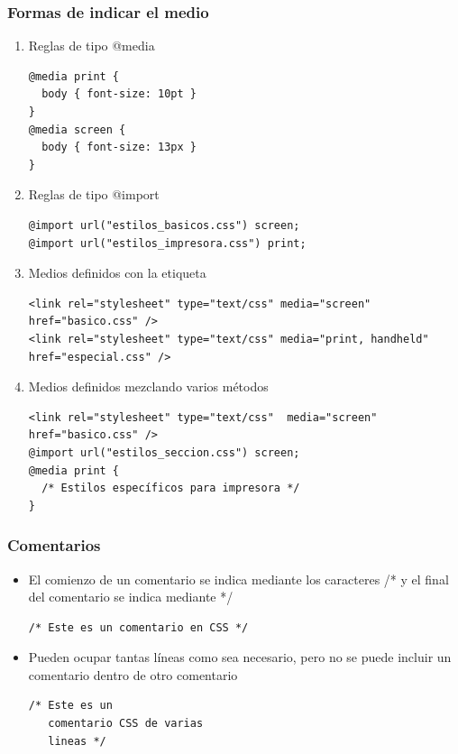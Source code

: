 
\begin{frame}[fragile]
\frametitle{Formas de indicar el medio}

\begin{enumerate}
  \item Reglas de tipo @media
{\footnotesize
    \begin{verbatim}
@media print {
  body { font-size: 10pt }
}
@media screen {
  body { font-size: 13px }
}
    \end{verbatim}
}
  \item Reglas de tipo @import
{\footnotesize
    \begin{verbatim}
@import url("estilos_basicos.css") screen;
@import url("estilos_impresora.css") print;
    \end{verbatim}
}
  \item Medios definidos con la etiqueta
{\footnotesize
    \begin{verbatim}
<link rel="stylesheet" type="text/css" media="screen" href="basico.css" />
<link rel="stylesheet" type="text/css" media="print, handheld" href="especial.css" />
    \end{verbatim}
}
  \item Medios definidos mezclando varios métodos
{\footnotesize
    \begin{verbatim}
<link rel="stylesheet" type="text/css"  media="screen" href="basico.css" />
@import url("estilos_seccion.css") screen;
@media print {
  /* Estilos específicos para impresora */
}
    \end{verbatim}
}
\end{enumerate}

\end{frame}


\begin{frame}[fragile]
\frametitle{Comentarios}

\begin{itemize}
  \item El comienzo de un comentario se indica mediante los caracteres /* y el final del comentario se indica mediante */
    \begin{verbatim}
/* Este es un comentario en CSS */
    \end{verbatim}
  \item Pueden ocupar tantas líneas como sea necesario, pero no se puede incluir un comentario dentro de otro comentario
    \begin{verbatim}
/* Este es un
   comentario CSS de varias
   lineas */
    \end{verbatim}
\end{itemize}

\end{frame}



